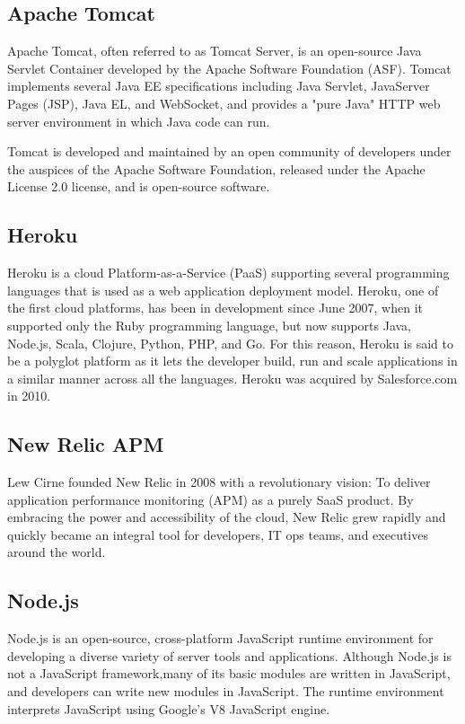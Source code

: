 \documentclass[12pt,a4paper,oneside]{report}
\begin{document}
{\subsection{Apache Tomcat}
\par
Apache Tomcat, often referred to as Tomcat Server, is an open-source Java Servlet Container developed by the Apache Software Foundation (ASF). Tomcat implements several Java EE specifications including Java Servlet, JavaServer Pages (JSP), Java EL, and WebSocket, and provides a "pure Java" HTTP web server environment in which Java code can run.

Tomcat is developed and maintained by an open community of developers under the auspices of the Apache Software Foundation, released under the Apache License 2.0 license, and is open-source software.
\subsection{Heroku}
\par
Heroku is a cloud Platform-as-a-Service (PaaS) supporting several programming languages that is used as a web application deployment model. Heroku, one of the first cloud platforms, has been in development since June 2007, when it supported only the Ruby programming language, but now supports Java, Node.js, Scala, Clojure, Python, PHP, and Go. For this reason, Heroku is said to be a polyglot platform as it lets the developer build, run and scale applications in a similar manner across all the languages. Heroku was acquired by Salesforce.com in 2010.
\subsection{New Relic APM}
\par
Lew Cirne founded New Relic in 2008 with a revolutionary vision: To deliver application performance monitoring (APM) as a purely SaaS product. By embracing the power and accessibility of the cloud, New Relic grew rapidly and quickly became an integral tool for developers, IT ops teams, and executives around the world.

\subsection{Node.js}
\par
Node.js is an open-source, cross-platform JavaScript runtime environment for developing a diverse variety of server tools and applications. Although Node.js is not a JavaScript framework,many of its basic modules are written in JavaScript, and developers can write new modules in JavaScript. The runtime environment interprets JavaScript using Google's V8 JavaScript engine.

}
\end{document}
